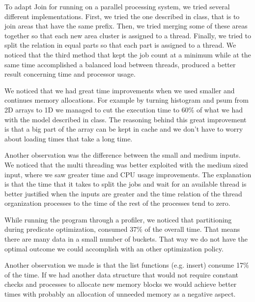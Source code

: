 \documentclass{ws-ijprai}
\begin{document}
\tab To adapt Join for running on a parallel processing system, we tried several different implementations. First, we tried the one described in class, that is to join areas that have the same prefix. Then, we tried merging some of these areas together so that each new area cluster is assigned to a thread. Finally, we tried to split the relation in equal parts so that each part is assigned to a thread. We noticed that the third method that kept the job count at a minimum while at the same time accomplished a balanced load between threads, produced a better result concerning time and processor usage.

\tab We noticed that we had great time improvements when we used smaller and continues memory allocations. For example by turning histogram and psum from 2D arrays to 1D we managed to cut the execution time to 60\% of what we had with the model described in class. The reasoning behind this great improvement is that a big part of the array can be kept in cache and we don't have to worry about loading times that take a long time.

\tab Another observation was the difference between the small and medium inputs. We noticed that the multi threading was better exploited with the medium sized input, where we saw greater time and CPU usage improvements. The explanation is that the time that it takes to split the jobs and wait for an available thread is better justified when the inputs are greater and the time relation of the thread organization processes to the time of the rest of the processes tend to zero.

\tab While running the program through a profiler, we noticed that partitioning during predicate optimization, consumed 37\% of the overall time. That means there are many data in a small number of buckets. That way we do not have the optimal outcome we could accomplish with an other optimization policy.

\tab Another observation we made is that the list functions (e.g. insert) consume 17\% of the time. If we had another data structure that would not require constant checks and processes to allocate new memory blocks we would achieve better times with probably an allocation of unneeded memory as a negative aspect.
\end{document}
